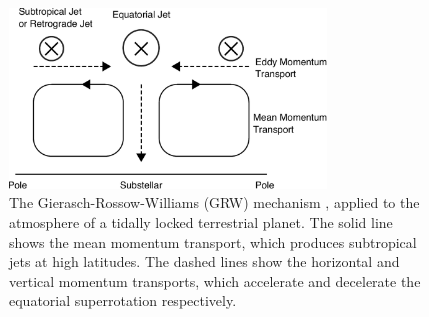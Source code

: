 \begin{figure}
  \centering
  \includegraphics[width=0.75\textwidth]{figures/eqm-zonal-flow/gierasch-tl.pdf}
  \caption{The Gierasch-Rossow-Williams (GRW) mechanism \citep{read2018superrotation}, applied to the atmosphere of a tidally locked terrestrial planet. The solid line shows the mean momentum transport, which produces subtropical jets at high latitudes. The dashed lines show the horizontal and vertical momentum transports, which accelerate and decelerate the equatorial superrotation respectively.}
  \label{fig:gierasch}
\end{figure}







